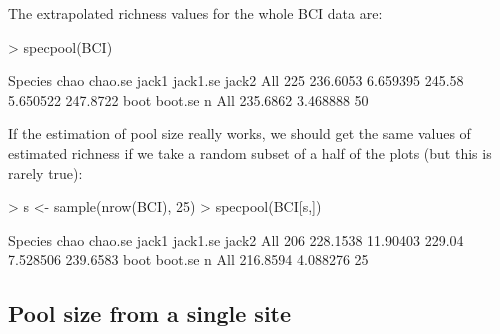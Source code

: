 \documentclass[a4paper,10pt,twocolumn]{article}
\begin{document}
The extrapolated richness values for the whole BCI data are:
\begin{Schunk}
\begin{Sinput}
> specpool(BCI)
\end{Sinput}
\begin{Soutput}
    Species     chao  chao.se  jack1 jack1.se    jack2
All     225 236.6053 6.659395 245.58 5.650522 247.8722
        boot  boot.se  n
All 235.6862 3.468888 50
\end{Soutput}
\end{Schunk}
If the estimation of pool size really works, we should get the same
values of estimated richness if we take a random subset of a half of
the plots (but this is rarely true):
\begin{Schunk}
\begin{Sinput}
> s <- sample(nrow(BCI), 25)
> specpool(BCI[s,])
\end{Sinput}
\begin{Soutput}
    Species     chao  chao.se  jack1 jack1.se    jack2
All     206 228.1538 11.90403 229.04 7.528506 239.6583
        boot  boot.se  n
All 216.8594 4.088276 25
\end{Soutput}
\end{Schunk}

\subsection{Pool size from a single site}
\end{document}
